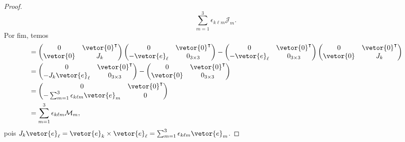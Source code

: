 \begin{proof}
\begin{equation*}
        \sum_{m = 1}^3 \epsilon_{k \ell m} \mathcal{J}_m.
    \end{equation*}
    Por fim, temos
    \begin{align*}
        [\mathcal{J}_k,\mathcal{M}_\ell] &=
        \begin{pmatrix}
            0 & \vetor{0}^\intercal\\
            \vetor{0} & J_k
        \end{pmatrix}
        \begin{pmatrix}
            0 & \vetor{0}^\intercal\\
            -\vetor{e}_\ell & 0_{3\times3}
        \end{pmatrix}-
        \begin{pmatrix}
            0 & \vetor{0}^\intercal\\
            -\vetor{e}_\ell & 0_{3\times3}
        \end{pmatrix}
        \begin{pmatrix}
            0 & \vetor{0}^\intercal\\
            \vetor{0} & J_k
        \end{pmatrix}\\
        &=
        \begin{pmatrix}
            0 & \vetor{0}^\intercal\\
            -J_k\vetor{e}_\ell & 0_{3\times 3}
        \end{pmatrix}-
        \begin{pmatrix}
            0 & \vetor{0}^\intercal\\
            \vetor{0} & 0_{3\times3}
        \end{pmatrix}\\
        &=
        \begin{pmatrix}
            0 & \vetor{0}^\intercal\\
            -\sum_{m=1}^3 \epsilon_{k\ell m}\vetor{e}_m & 0
        \end{pmatrix}\\
        &=
        \sum_{m=1}^3 \epsilon_{k \ell m} \mathcal{M}_m,
    \end{align*}
    pois \(J_k \vetor{e}_\ell = \vetor{e}_k \times \vetor{e}_\ell = \sum_{m=1}^3 \epsilon_{k \ell m}\vetor{e}_m\).
\end{proof}
